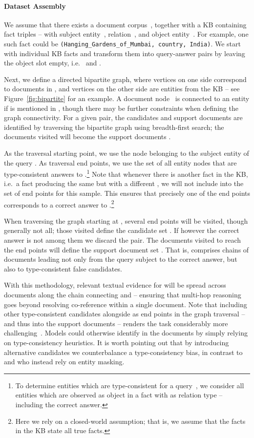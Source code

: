 \documentclass[11pt,letterpaper]{article}
\begin{document}
\paragraph{Dataset Assembly}
We assume that there exists a document corpus~, together with a KB containing fact triples  -- with subject entity~, relation~, and object entity~.
For example, one such fact could be \texttt{\smaller (Hanging\_Gardens\_of\_Mumbai, country, India)}.
We start with individual KB facts and transform them into query-answer pairs by leaving the object slot empty, i.e.~ and .


Next, we define a directed bipartite graph, where vertices on one side correspond to documents in , and vertices on the other side are entities from the KB -- see Figure~\ref{fig:bipartite} for an example.
A document node~ is connected to an entity  if  is mentioned in , though there may be further constraints when defining the graph connectivity.
For a given  pair, the candidates  and support documents  are identified by traversing the bipartite graph using breadth-first search; the documents visited will become the support documents .


As the traversal starting point, we use the node belonging to the subject entity  of the query . 
As traversal end points, we use the set of all entity nodes that are type-consistent answers to .\footnote{
    To determine entities which are type-consistent for a query~, we consider all entities which are observed as object in a fact with  as relation type -- including the correct answer.
}
Note that whenever there is another fact  in the KB, i.e.\ a fact producing the same  but with a different , we will not include  into the set of end points for this sample.
This ensures that precisely one of the end points corresponds to a correct answer to .\footnote{Here we rely on a closed-world assumption; that is, we assume that the facts in the KB state all true facts.}


When traversing the graph starting at , several end points will be visited, though generally not all; those visited define the candidate set .
If however the correct answer  is not among them we discard the  pair.
The documents visited to reach the end points will define the support document set . 
That is,  comprises chains of documents leading not only from the query subject to the correct answer, but also to type-consistent false candidates.

With this methodology, relevant textual evidence for  will be spread across documents along the chain connecting  and  -- ensuring that multi-hop reasoning goes beyond resolving co-reference within a single document.
Note that including other type-consistent candidates alongside  as end points in the graph traversal -- and thus into the support documents -- renders the task considerably more challenging~\cite{jia_2017_adversarial}.
Models could otherwise identify  in the documents by simply relying on type-consistency heuristics. 
It is worth pointing out that by introducing alternative candidates we counterbalance a type-consistency bias, in contrast to  and  who instead rely on entity masking.
\end{document}

